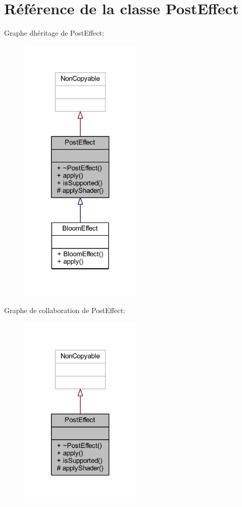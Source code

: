 \hypertarget{class_post_effect}{}\section{Référence de la classe Post\+Effect}
\label{class_post_effect}


Graphe d\textquotesingle{}héritage de Post\+Effect\+:\nopagebreak
\begin{figure}[H]
\begin{center}
\leavevmode
\includegraphics[width=165pt]{class_post_effect__inherit__graph}
\end{center}
\end{figure}


Graphe de collaboration de Post\+Effect\+:\nopagebreak
\begin{figure}[H]
\begin{center}
\leavevmode
\includegraphics[width=165pt]{class_post_effect__coll__graph}
\end{center}
\end{figure}

